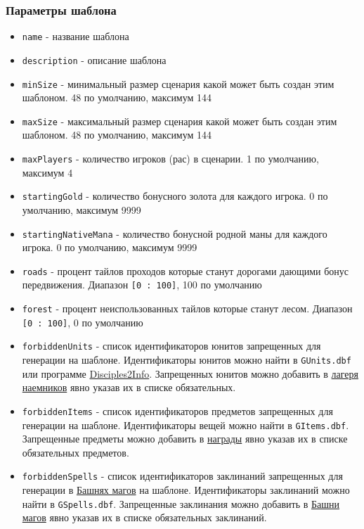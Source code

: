 \subsubsection{Параметры шаблона}
\begin{itemize}
\item \texttt{name} - название шаблона
\item \texttt{description} - описание шаблона
\item \texttt{minSize} - минимальный размер сценария какой может быть создан этим шаблоном. 48 по умолчанию, максимум 144
\item \texttt{maxSize} - максимальный размер сценария какой может быть создан этим шаблоном. 48 по умолчанию, максимум 144
\item \texttt{maxPlayers} - количество игроков (рас) в сценарии. 1 по умолчанию, максимум 4
\item \texttt{startingGold} - количество бонусного золота для каждого игрока. 0 по умолчанию, максимум 9999
\item \texttt{startingNativeMana} - количество бонусной родной маны для каждого игрока. 0 по умолчанию, максимум 9999
\item \texttt{roads} - процент тайлов проходов которые станут дорогами дающими бонус передвижения. Диапазон \texttt{[0 : 100]}, 100 по умолчанию
\item \texttt{forest} - процент неиспользованных тайлов которые станут лесом. Диапазон \texttt{[0 : 100]}, 0 по умолчанию

\item \texttt{forbiddenUnits} - список идентификаторов юнитов запрещенных для генерации на шаблоне.
Идентификаторы юнитов можно найти в \texttt{GUnits.dbf} или программе
\href{https://drive.google.com/file/d/1hI7OYhoQbeizglwZwY8UuWSSr6Q1i6WO/view}{Disciples2Info}.
Запрещенных юнитов можно добавить в \hyperref[mercenary]{лагеря наемников} явно указав их в списке обязательных.

\item \texttt{forbiddenItems} - список идентификаторов предметов запрещенных для генерации на шаблоне.
Идентификаторы вещей можно найти в \texttt{GItems.dbf}.
Запрещенные предметы можно добавить в \hyperref[loot]{награды} явно указав их в списке обязательных предметов.

\item \texttt{forbiddenSpells} - список идентификаторов заклинаний запрещенных для генерации в \hyperref[mage]{Башнях магов} на шаблоне.
Идентификаторы заклинаний можно найти в \texttt{GSpells.dbf}.
Запрещенные заклинания можно добавить в \hyperref[mage]{Башни магов} явно указав их в списке обязательных заклинаний.
\end{itemize}

